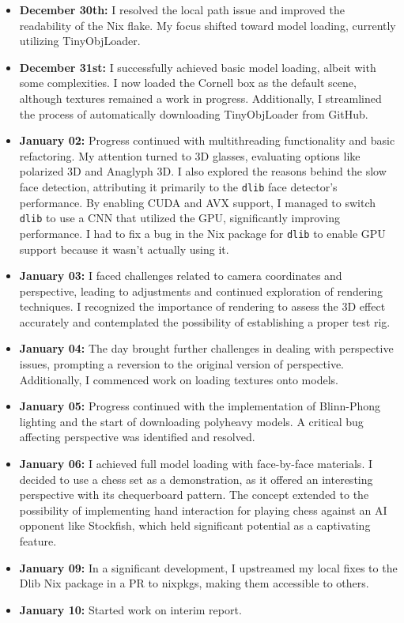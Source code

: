 \begin{itemize}
    \item \textbf{December 30th:} I resolved the local path issue and improved the readability of the Nix flake. My focus shifted toward model loading, currently utilizing TinyObjLoader.

    \item \textbf{December 31st:} I successfully achieved basic model loading, albeit with some complexities. I now loaded the Cornell box as the default scene, although textures remained a work in progress. Additionally, I streamlined the process of automatically downloading TinyObjLoader from GitHub.

    \item \textbf{January 02:} Progress continued with multithreading functionality and basic refactoring. My attention turned to 3D glasses, evaluating options like polarized 3D and Anaglyph 3D. I also explored the reasons behind the slow face detection, attributing it primarily to the \texttt{dlib} face detector's performance. By enabling CUDA and AVX support, I managed to switch \texttt{dlib} to use a CNN that utilized the GPU, significantly improving performance. I had to fix a bug in the Nix package for \texttt{dlib} to enable GPU support because it wasn't actually using it.

    \item \textbf{January 03:} I faced challenges related to camera coordinates and perspective, leading to adjustments and continued exploration of rendering techniques. I recognized the importance of rendering to assess the 3D effect accurately and contemplated the possibility of establishing a proper test rig.

    \item \textbf{January 04:} The day brought further challenges in dealing with perspective issues, prompting a reversion to the original version of perspective. Additionally, I commenced work on loading textures onto models.

    \item \textbf{January 05:} Progress continued with the implementation of Blinn-Phong lighting and the start of downloading polyheavy models. A critical bug affecting perspective was identified and resolved.

    \item \textbf{January 06:} I achieved full model loading with face-by-face materials. I decided to use a chess set as a demonstration, as it offered an interesting perspective with its chequerboard pattern. The concept extended to the possibility of implementing hand interaction for playing chess against an AI opponent like Stockfish, which held significant potential as a captivating feature.

    \item \textbf{January 09:} In a significant development, I upstreamed my local fixes to the Dlib Nix package in a PR to nixpkgs, making them accessible to others.

    \item \textbf{January 10:} Started work on interim report.
\end{itemize}

